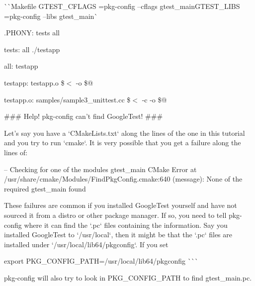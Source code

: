 \`{}\`{}{\ttfamily Makefile G\+T\+E\+S\+T\+\_\+\+C\+F\+L\+A\+GS =}pkg-\/config --cflags gtest\+\_\+main{\ttfamily  G\+T\+E\+S\+T\+\_\+\+L\+I\+BS =}pkg-\/config --libs gtest\+\_\+main\`{}

.P\+H\+O\+NY\+: tests all

tests\+: all ./testapp

all\+: testapp

testapp\+: testapp.\+o    \$$<$ -\/o \$@ 

testapp.\+o\+: samples/sample3\+\_\+unittest.\+cc    \$$<$ -\/c -\/o \$@  
\begin{DoxyCode}
### Help! pkg-config can't find GoogleTest! ###

Let's say you have a `CMakeLists.txt` along the lines of the one in this
tutorial and you try to run `cmake`. It is very possible that you get a
failure along the lines of:
\end{DoxyCode}
 -- Checking for one of the modules \textquotesingle{}gtest\+\_\+main\textquotesingle{} C\+Make Error at /usr/share/cmake/\+Modules/\+Find\+Pkg\+Config.cmake\+:640 (message)\+: None of the required \textquotesingle{}gtest\+\_\+main\textquotesingle{} found 
\begin{DoxyCode}
These failures are common if you installed GoogleTest yourself and have not
sourced it from a distro or other package manager. If so, you need to tell
pkg-config where it can find the `.pc` files containing the information.
Say you installed GoogleTest to `/usr/local`, then it might be that the
`.pc` files are installed under `/usr/local/lib64/pkgconfig`. If you set
\end{DoxyCode}
 export P\+K\+G\+\_\+\+C\+O\+N\+F\+I\+G\+\_\+\+P\+A\+TH=/usr/local/lib64/pkgconfig \`{}\`{}\`{}

pkg-\/config will also try to look in {\ttfamily P\+K\+G\+\_\+\+C\+O\+N\+F\+I\+G\+\_\+\+P\+A\+TH} to find {\ttfamily gtest\+\_\+main.\+pc}. 